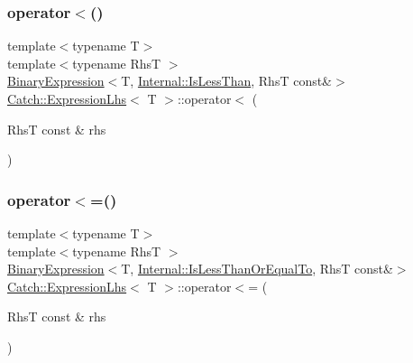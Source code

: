 \subsubsection{\texorpdfstring{operator$<$()}{operator<()}}
{\footnotesize\ttfamily template$<$typename T$>$ \\
template$<$typename RhsT $>$ \\
\hyperlink{class_catch_1_1_binary_expression}{Binary\+Expression}$<$T, \hyperlink{namespace_catch_1_1_internal_ae3f96598a7858155750bf38e7295d83eabbbfc41706595e50acbefa8408004b93}{Internal\+::\+Is\+Less\+Than}, RhsT const\&$>$ \hyperlink{class_catch_1_1_expression_lhs}{Catch\+::\+Expression\+Lhs}$<$ T $>$\+::operator$<$ (\begin{DoxyParamCaption}\item[{RhsT const \&}]{rhs }\end{DoxyParamCaption})\hspace{0.3cm}{\ttfamily [inline]}}

\mbox{\label{class_catch_1_1_expression_lhs_a1d10974a581c67cc400cd6cdd36b0000}} 
\subsubsection{\texorpdfstring{operator$<$=()}{operator<=()}}
{\footnotesize\ttfamily template$<$typename T$>$ \\
template$<$typename RhsT $>$ \\
\hyperlink{class_catch_1_1_binary_expression}{Binary\+Expression}$<$T, \hyperlink{namespace_catch_1_1_internal_ae3f96598a7858155750bf38e7295d83ea0db29a4c3f1e81260036c5e27a8407fd}{Internal\+::\+Is\+Less\+Than\+Or\+Equal\+To}, RhsT const\&$>$ \hyperlink{class_catch_1_1_expression_lhs}{Catch\+::\+Expression\+Lhs}$<$ T $>$\+::operator$<$= (\begin{DoxyParamCaption}\item[{RhsT const \&}]{rhs }\end{DoxyParamCaption})\hspace{0.3cm}{\ttfamily [inline]}}

\mbox{\label{class_catch_1_1_expression_lhs_a60d50fe8adcaabcb7c93747ddbae5993}} 
